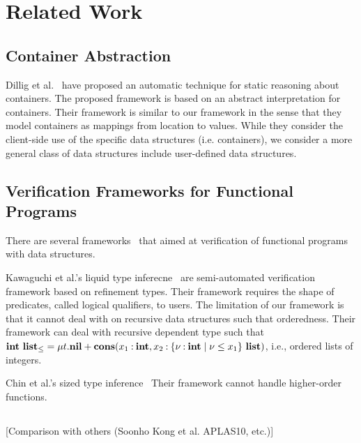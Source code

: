\section{Related Work}
\label{sec:related}

\subsection{Container Abstraction}
Dillig et al.~\cite{Dillig2011} have proposed an automatic technique for
static reasoning about containers.  The proposed framework is based on
an abstract interpretation for containers.  Their framework is similar
to our framework in the sense that they model containers as mappings
from location to values.  While they consider the client-side use of the
specific data structures (i.e. containers), we consider a more general
class of data structures include user-defined data structures.


\subsection{Verification Frameworks for Functional Programs}
There are several
frameworks~\cite{Kawaguchi2009,Chin2003,Unno2010,Ong2011} that aimed at
verification of functional programs with data structures.

Kawaguchi et al.'s liquid type inferecne~\cite{Kawaguchi2009} are
semi-automated verification framework based on refinement types.
Their framework requires the shape of predicates, called logical qualifiers, to users.
The limitation of our framework is that it cannot deal with
 on recursive data structures such that
orderedness.  Their framework can deal with recursive dependent type
such that ${\mathbf{int}}~{\mathbf{list}_\leq} = \mu t.\mathbf{nil} +
\mathbf{cons}({x_1\mathbin{:}\mathbf{int}},{x_2\mathbin{:}{\{\nu\mathbin{:}\mathbf{int} \mid \nu \leq
x_1\}}~{\mathbf{list}}})$, i.e., ordered lists of integers.

Chin et al.'s sized type inference~\cite{Chin2003}
Their framework cannot handle higher-order functions.


\subsection{}
[Comparison with others (Soonho Kong et al. APLAS10, etc.)]
